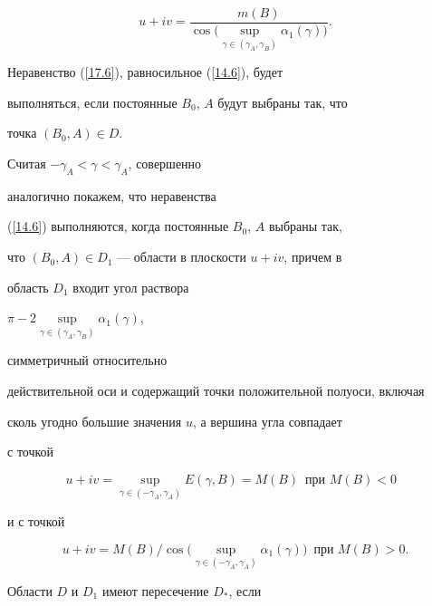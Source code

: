 {$$


u+iv=\frac{m(B)}{\cos\big(\sup\limits_{\gamma\in(\gamma_{A},\gamma_{B})}


\alpha_{1}(\gamma)\big)}.


$$





Неравенство (\ref{17.6}), равносильное (\ref{14.6}), будет


выполняться, если постоянные $B_{0}$, $A$ будут выбраны так, что


точка $(B_{0},A)\in D$.





Считая $-\gamma_{A} <\gamma <\gamma_{A}$, совершенно


аналогично покажем, что неравенства


(\ref{14.6}) выполняются, когда постоянные $B_{0}$, $A$ выбраны так,


что $(B_{0},A)\in D_{1}$ --- области в плоскости $u+iv$, причем в


область $D_{1}$ входит угол раствора


$\pi -2\sup\limits_{\gamma\in(\gamma_{A},\gamma_{B})}\alpha_{1}(\gamma)$,


симметричный относительно


действительной оси и содержащий точки положительной полуоси, включая


сколь угодно большие значения $u$, а вершина угла совпадает


с точкой


$$




u+iv=\sup\limits_{\gamma\in(-\gamma_{A},\gamma_{A})}E(\gamma,B)=M(B)


\ \; \text{при $M(B) < 0$ }




$$


и с точкой


$$


u+iv=M(B)/\cos\big(\sup\limits_{\gamma\in(-\gamma_{A},\gamma_{A})}


\alpha_{1}(\gamma)\big) \ \; \text{при $M(B) > 0$}.


$$





Области $D$ и $D_{1}$ имеют пересечение $D_{*}$, если


}
